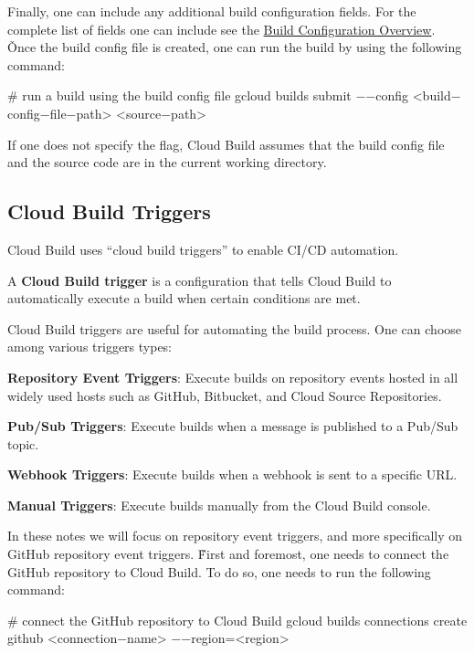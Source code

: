 Finally, one can include any additional build configuration fields. For the complete list of fields one can include
see the \href{https://cloud.google.com/build/docs/build-config-file-schema}{Build Configuration Overview}. \v

Once the build config file is created, one can run the build by using the following command:
\begin{bash}
# run a build using the build config file
gcloud builds submit $-$$-$config <build$-$config$-$file$-$path> <source$-$path>
\end{bash}

If one does not specify the  flag, Cloud Build assumes that the build config file and the source code
are in the current working directory.

\subsection{Cloud Build Triggers}\label{subsec:cloud_build_triggers}

Cloud Build uses ``cloud build triggers'' to enable CI/CD automation.

A \textbf{Cloud Build trigger} is a configuration that tells Cloud Build to automatically execute a build when certain
conditions are met.
\ed

Cloud Build triggers are useful for automating the build process. One can choose among various triggers types:
\bit
\item \textbf{Repository Event Triggers}: Execute builds on repository events hosted in all widely used hosts such as
GitHub, Bitbucket, and Cloud Source Repositories.
\item \textbf{Pub/Sub Triggers}: Execute builds when a message is published to a Pub/Sub topic.
\item \textbf{Webhook Triggers}: Execute builds when a webhook is sent to a specific URL\@.
\item \textbf{Manual Triggers}: Execute builds manually from the Cloud Build console.
\eit

In these notes we will focus on repository event triggers, and more specifically on GitHub repository event triggers. \v

First and foremost, one needs to connect the GitHub repository to Cloud Build. To do so, one needs to run the following
command:
\begin{bash}
# connect the GitHub repository to Cloud Build
gcloud builds connections create github <connection$-$name> $-$$-$region=<region>
\end{bash}

